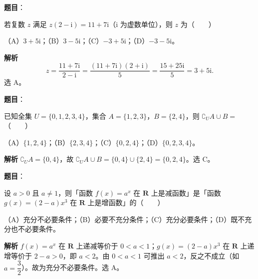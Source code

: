 
\begin{answer}

\textbf{题目}：

若复数 $z$ 满足 $z(2-\mathrm i)=11+7\mathrm i$（$\mathrm i$ 为虚数单位），则 $z$ 为\mbox{（　　）}

（A）$3+5\mathrm i$；（B）$3-5\mathrm i$；（C）$-3+5\mathrm i$；（D）$-3-5\mathrm i$。

\textbf{解析}
\nopagebreak[4]
\[z=\frac{11+7\mathrm i}{2-\mathrm i}=\frac{(11+7\mathrm i)(2+\mathrm i)}{5}=\frac{15+25\mathrm i}{5}=3+5\mathrm i.\]
选 A。


\end{answer}
\begin{answer}

\textbf{题目}：

已知全集 $U=\{0,1,2,3,4\}$，集合 $A=\{1,2,3\}$，$B=\{2,4\}$，则 $\complement_UA\cup B=$\mbox{（　　）}

（A）$\{1,2,4\}$；（B）$\{2,3,4\}$；（C）$\{0,2,4\}$；（D）$\{0,2,3,4\}$。

\textbf{解析}
$\complement_UA=\{0,4\}$，故 $\complement_UA\cup B=\{0,4\}\cup\{2,4\}=\{0,2,4\}$。选 C。


\end{answer}
\begin{answer}

\textbf{题目}：

设 $a>0$ 且 $a\neq1$，则「函数 $f(x)=a^x$ 在 $\mathbf R$ 上是减函数」是「函数 $g(x)=(2-a)x^3$ 在 $\mathbf R$ 上是增函数」的\mbox{（　　）}

（A）充分不必要条件；（B）必要不充分条件；（C）充分必要条件；（D）既不充分也不必要条件。

\textbf{解析}
$f(x)=a^x$ 在 $\mathbf R$ 上递减等价于 $0<a<1$；$g(x)=(2-a)x^3$ 在 $\mathbf R$ 上递增等价于 $2-a>0$，即 $a<2$。由 $0<a<1$ 可推出 $a<2$，反之不成立（如 $a=\dfrac32$）。故为充分不必要条件。选 A。


\end{answer}
